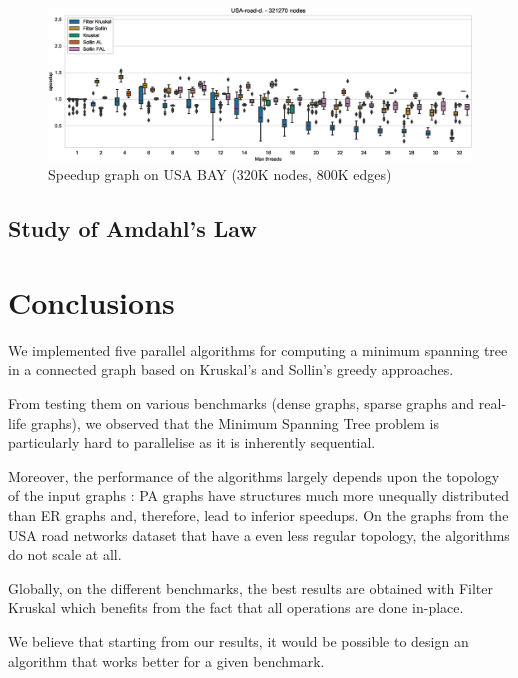 \documentclass[letterpaper]{article}
\begin{document}
\begin{figure}\centering
  \includegraphics[width=\linewidth]{graphics/Box_Speedup_USA-road-d._321270.eps}
  \caption{Speedup graph on USA BAY (320K nodes, 800K edges)\label{usaBAYspeedup}}
\end{figure}


\subsection{Study of Amdahl's Law}



\section{Conclusions}

We implemented five parallel algorithms for computing a minimum spanning tree in a connected graph based on Kruskal's and Sollin's greedy approaches.

From testing them on various benchmarks (dense graphs, sparse graphs and real-life graphs), we observed that the Minimum Spanning Tree problem is particularly hard to parallelise as it is inherently sequential. 

Moreover, the performance of the algorithms largely depends upon the topology of the input graphs : PA graphs have structures much more unequally distributed than ER graphs and, therefore, lead to inferior speedups. On the graphs from the USA road networks dataset that have a even less regular topology, the algorithms do not scale at all.

Globally, on the different benchmarks, the best results are obtained with Filter Kruskal which benefits from the fact that all operations are done in-place.

We believe that starting from our results, it would be possible to design an algorithm that works better for a given benchmark.


\clearpage



\end{document}
